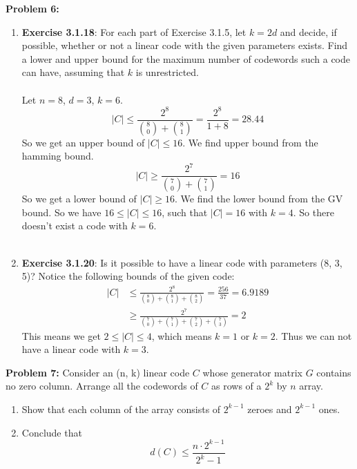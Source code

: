 \documentclass[11pt]{article}
\newenvironment{problem}[1]{\textbf{Problem #1: }}{\newpage}
\begin{document}
	\begin{problem}{6}
		\begin{enumerate}[label = (\alph*)]
			\item \textbf{Exercise 3.1.18}: 
			For each part of Exercise 3.1.5, let $k = 2d$ and decide, if possible, whether or not a  linear code with the given parameters exists. Find a lower and upper bound for the maximum number of codewords such a  code can have, assuming that $k$ is unrestricted.
			\\ \\
			Let $n = 8$, $d = 3$, $k = 6$.
			\[|C| \leq \frac{2^8}{\binom{8}{0} + \binom{8}{1}} = \frac{2^8}{1 + 8} = 28.44\]
			So we get an upper bound of $|C| \leq 16$.  We find upper bound from the hamming bound.
			\[|C| \geq \frac{2^7}{\binom{7}{0} + \binom{7}{1}} = 16\]
			So we get a lower bound of $|C| \geq 16$.  We find the lower bound from the GV bound.  
			So we have $16 \leq |C| \leq 16$, such that $|C| = 16$ with $k = 4$.  So there doesn't exist a code with $k = 6$.
			\\ \\
			\item \textbf{Exercise 3.1.20}: 
			Is it possible to have a linear code with parameters (8, 3, 5)?
			Notice the following bounds of the given code:
			\begin{align*}
				|C| &\leq \frac{2^8}{\binom{8}{0} + \binom{8}{1} + \binom{8}{2}} = \frac{256}{37} = 6.9189 \\
				&\geq \frac{2^7}{\binom{7}{0} + \binom{7}{1} + \binom{7}{2} + \binom{7}{3}} = 2
			\end{align*}
			This means we get $2 \leq |C| \leq 4$, which means $k = 1$ or $k = 2$.  Thus we can not have a linear code with $k = 3$.
		\end{enumerate}
	\end{problem}

	\begin{problem}{7}
		Consider an (n, k) linear code $C$ whose generator matrix $G$ contains
		no zero column. Arrange all the codewords of $C$ as rows of a $2^k$ by $n$ array.

		\begin{enumerate}[label = (\alph*)]
			\item  Show that each column of the array consists of $2^{k-1}$	zeroes and $2^{k-1}$ ones.
			\item Conclude that
			\[d(C) \leq \frac{n \cdot 2^{k-1}}{2^{k}-1}\]
		\end{enumerate}
	\end{problem}
\end{document}
